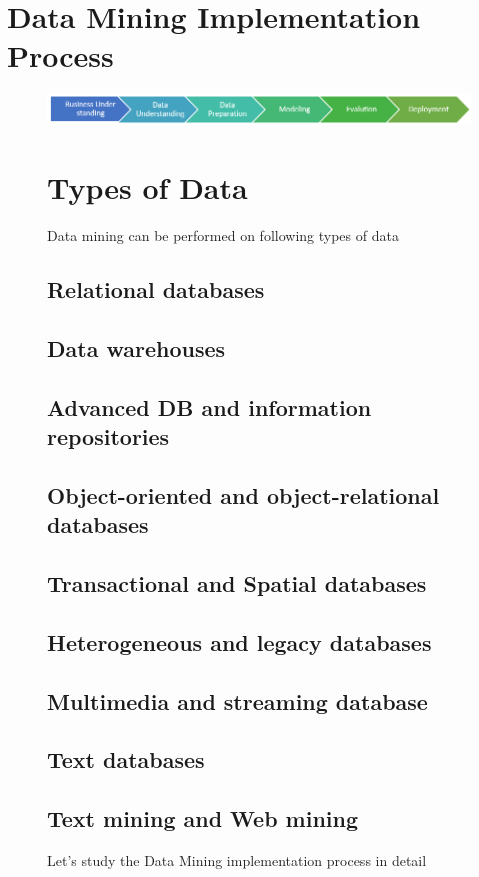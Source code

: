 \documentclass{article}
\begin{document}
\section{Data Mining Implementation Process}
\begin{figure}[H]
\includegraphics[height=.450in•]{data_mining_2.png}
\caption{Let's study the Data Mining implementation process in detail}
\centering\section{Types of Data}

Data mining can be performed on following types of data\\
[2mm]
\subsection{Relational databases}
\subsection{Data warehouses}
\subsection{Advanced DB and information repositories}
\subsection{Object-oriented and object-relational databases}
\subsection{Transactional and Spatial databases}
\subsection{Heterogeneous and legacy databases}
\subsection{Multimedia and streaming database}
\subsection{Text databases}
\subsection{Text mining and Web mining}

\end{figure}
\end{document}
